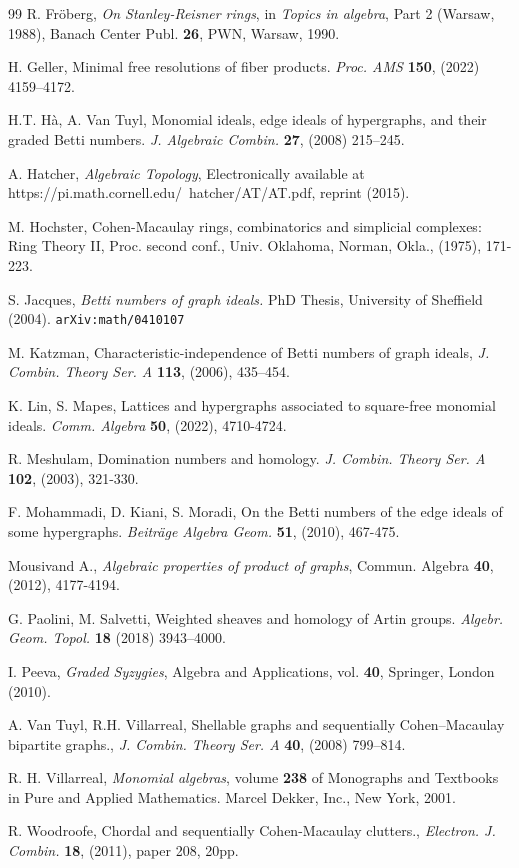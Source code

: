 \documentclass[12pt,reqno]{amsart}
\theoremstyle{definition}
\begin{document}
\begin{thebibliography}{99}
R. Fr{\"o}berg, {\it On Stanley-Reisner rings}, in {\it Topics in algebra}, Part 2 (Warsaw, 1988), Banach Center Publ. {\bf 26}, PWN, Warsaw, 1990.

H. Geller,
Minimal free resolutions of fiber products.
\emph{Proc. AMS} {\bf 150}, (2022) 4159--4172.

H.T. H\`a, A. Van Tuyl,
Monomial ideals, edge ideals of hypergraphs, and their graded Betti numbers.
\emph{J. Algebraic Combin.} {\bf 27}, (2008) 215--245.

 A. Hatcher, {\em Algebraic Topology}, Electronically available at https://pi.math.cornell.edu/~hatcher/AT/AT.pdf, reprint (2015).

  M. Hochster, Cohen-Macaulay rings, combinatorics and simplicial complexes: Ring Theory II, Proc. second conf., Univ. Oklahoma, Norman, Okla., (1975), 171-223. 

S. Jacques, {\it Betti numbers of graph ideals.} PhD Thesis, University of Sheffield (2004).
{\tt 	arXiv:math/0410107}

 M. Katzman, Characteristic-independence of Betti numbers of graph ideals, {\em J. Combin. Theory Ser. A} {\bf 113}, (2006), 435–454.

 K. Lin, S. Mapes, Lattices and hypergraphs associated to square-free monomial ideals. \emph{Comm. Algebra} {\bf 50}, (2022), 4710-4724.

  R. Meshulam, Domination numbers and homology. \emph{J. Combin. Theory Ser. A} {\bf 102}, (2003), 321-330.

 F. Mohammadi, D. Kiani, S. Moradi, On the Betti numbers of the edge ideals of some hypergraphs. \emph{Beiträge Algebra Geom.} {\bf 51}, (2010), 467-475.

 Mousivand A., {\em Algebraic properties of product of graphs}, Commun. Algebra {\bf 40}, (2012), 4177-4194.

G. Paolini, M. Salvetti,
Weighted sheaves and homology of Artin groups.
\emph{Algebr. Geom. Topol.} {\bf 18} (2018) 3943--4000.

 I. Peeva, {\em Graded Syzygies}, Algebra and Applications, vol. {\bf 40}, Springer, London (2010).

 A. Van Tuyl, R.H. Villarreal, Shellable graphs and sequentially Cohen–Macaulay bipartite graphs., {\em J. Combin. Theory Ser. A }{\bf 40}, (2008) 799–814.

 R. H. Villarreal, {\em Monomial algebras}, volume {\bf 238} of Monographs and Textbooks in Pure and Applied
Mathematics. Marcel Dekker, Inc., New York, 2001.

 R. Woodroofe, Chordal and sequentially {C}ohen-{M}acaulay clutters., \emph{Electron. J. Combin.} {\bf 18}, (2011), paper 208, 20pp.

\end{thebibliography}
\end{document}
